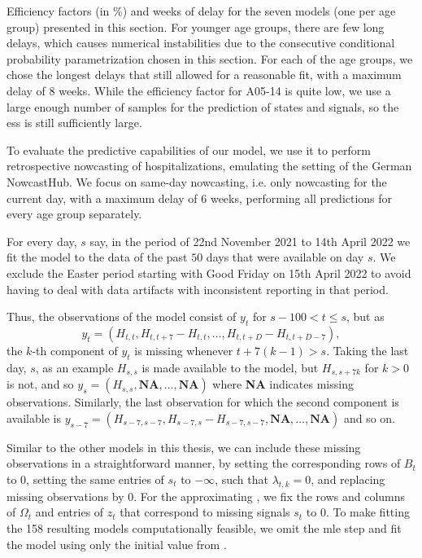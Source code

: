 \begin{table}
    \centering
    
    \caption{Efficiency factors (in \%) and weeks of delay for the seven models (one per age group) presented in this section. For younger age groups, there are few long delays, which causes numerical instabilities due to the consecutive conditional probability parametrization chosen in this section. For each of the age groups, we chose the longest delays that still allowed for a reasonable fit, with a maximum delay of $8$ weeks. While the efficiency factor for A05-14 is quite low, we use a large enough number of samples for the prediction of states and signals, so the \acrshort{ess} is still sufficiently large.}
    \label{tab:hospitalization_showcase_ess}
\end{table}






To evaluate the predictive capabilities of our model, we use it to perform retrospective nowcasting of hospitalizations, emulating the setting of the German NowcastHub. 
We focus on same-day nowcasting, i.e. only nowcasting for the current day, with a maximum delay of $6$ weeks,   performing all predictions for every age group separately. 

For every day, $s$ say, in the period of 22nd November 2021 to 14th April 2022 we fit the model to the data of the past $50$ days that were available on day $s$. 
We exclude the Easter period starting with Good Friday on 15th April 2022 to avoid having to deal with data artifacts with inconsistent reporting in that period.

Thus, the observations of the model consist of $y_{t}$ for $s - 100 < t \leq s$, but as 
$$
    y_{t} = \left( H_{t,t}, H_{t, t + 7} - H_{t,t}, \dots, H_{t, t + D}  - H_{t,t + D - 7}\right),
$$
the $k$-th component of $y_{t}$ is missing whenever $t + 7(k - 1) > s$. 
Taking the last day, $s$, as an example $H_{s,s}$ is made available to the model, but $H_{s, s+7k}$ for $k > 0$ is not, and so $y_{s} = \left( H_{s,s}, \textbf{NA}, \dots, \textbf{NA} \right)$ where \textbf{NA} indicates missing observations. Similarly, the last observation for which the second component is available is $y_{s - 7} = \left( H_{s-7, s-7}, H_{s-7, s} - H_{s - 7, s - 7}, \textbf{NA}, \dots, \textbf{NA} \right)$ and so on. 

Similar to the other models in this thesis, we can include these missing observations in a straightforward manner, by setting the corresponding rows of $B_{t}$ to $0$, setting the same entries of $s_{t}$ to $-\infty$, such that $\lambda_{t,k} = 0$, and replacing missing observations by $0$. For the approximating , we fix the rows and columns of $\Omega_{t}$ and entries of $z_{t}$ that correspond to missing signals $s_{t}$ to $0$. 
To make fitting the 158 resulting models computationally feasible, we omit the \acrshort{mle} step and fit the model using only the initial value from . 

